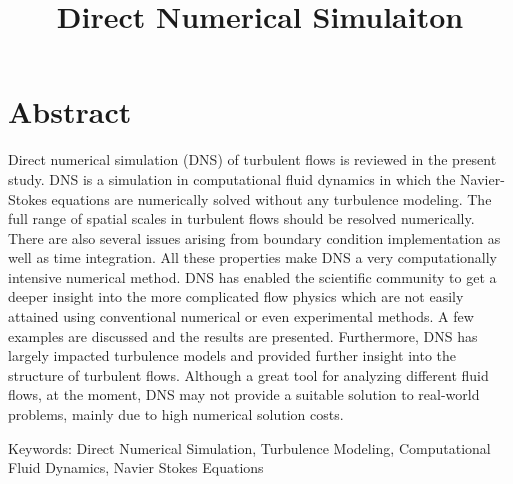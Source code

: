 \documentclass[12pt,oneside,a4paper,english]{article}
\title{Direct Numerical Simulaiton} %
\begin{document}


\newpage
{}
\section*{Abstract} \label{abstract}
Direct numerical simulation (DNS) of turbulent flows is reviewed in the present study. DNS is a simulation in computational fluid dynamics in which the Navier-Stokes equations are numerically solved without any turbulence modeling. The full range of spatial scales in turbulent flows should be resolved numerically. There are also several issues arising from boundary condition implementation as well as time integration. All these properties make DNS a very computationally intensive numerical method. DNS has enabled the scientific community to get a deeper insight into the more complicated flow physics which are not easily attained using conventional numerical or even experimental methods. A few examples are discussed and the results are presented. Furthermore, DNS has largely impacted turbulence models and provided further insight into the structure of turbulent flows. Although a great tool for analyzing different fluid flows, at the moment, DNS may not provide a suitable solution to real-world problems, mainly due to high numerical solution costs.

Keywords: Direct Numerical Simulation, Turbulence Modeling, Computational Fluid Dynamics, Navier Stokes Equations
\thispagestyle{fancy}

\newpage
\doublespacing
\renewcommand{\baselinestretch}{1}\normalsize
\tableofcontents
\renewcommand{\baselinestretch}{1}\normalsize
\thispagestyle{fancy} %

\newpage
{}
\listoffigures
\thispagestyle{fancy}

\newpage
{}
\listoftables
\thispagestyle{fancy}

\newpage
{}

\thispagestyle{fancy}








\clearpage
{}
\end{document}
